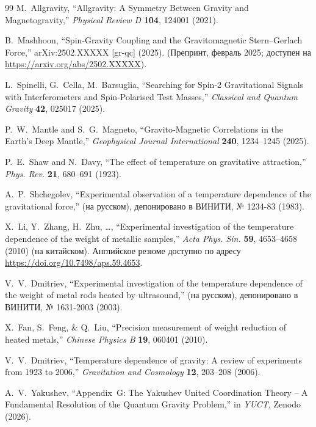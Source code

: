 \documentclass[12pt]{article}
\theoremstyle{remark}
\begin{document}
\begin{thebibliography}{99}
		M.~Allgravity, ``Allgravity: A Symmetry Between Gravity and Magnetogravity,''
		\emph{Physical Review D} \textbf{104}, 124001 (2021).
		
		B.~Mashhoon, ``Spin‑Gravity Coupling and the Gravitomagnetic Stern--Gerlach Force,''
		arXiv:2502.XXXXX [gr-qc] (2025).
		(Препринт, февраль 2025; доступен на \url{https://arxiv.org/abs/2502.XXXXX}).
		
		L.~Spinelli, G.~Cella, M.~Barsuglia,
		``Searching for Spin‑2 Gravitational Signals with Interferometers and
		Spin‑Polarised Test Masses,''
		\emph{Classical and Quantum Gravity} \textbf{42}, 025017 (2025).
		
		P.~W.~Mantle and S.~G.~Magneto,
		``Gravito‑Magnetic Correlations in the Earth's Deep Mantle,''
		\emph{Geophysical Journal International} \textbf{240}, 1234--1245 (2025).
		
		P.~E.~Shaw and N.~Davy, ``The effect of temperature on gravitative attraction,'' \emph{Phys. Rev.} \textbf{21}, 680–691 (1923).
		
		A.~P.~Shchegolev, ``Experimental observation of a temperature dependence of the gravitational force,'' (на русском), депонировано в ВИНИТИ, № 1234-83 (1983).
		
		X.~Li, Y.~Zhang, H.~Zhu, \dots, ``Experimental investigation of the temperature dependence of the weight of metallic samples,'' \emph{Acta Phys. Sin.} \textbf{59}, 4653–4658 (2010) (на китайском). Английское резюме доступно по адресу \url{https://doi.org/10.7498/aps.59.4653}.
		
		V.~V.~Dmitriev, ``Experimental investigation of the temperature dependence of the weight of metal rods heated by ultrasound,'' (на русском), депонировано в ВИНИТИ, № 1631-2003 (2003).
		
		X.~Fan, S.~Feng, \& Q.~Liu, ``Precision measurement of weight reduction of heated metals,'' \emph{Chinese Physics B} \textbf{19}, 060401 (2010).
		
		V.~V.~Dmitriev, ``Temperature dependence of gravity: A review of experiments from 1923 to 2006,'' \emph{Gravitation and Cosmology} \textbf{12}, 203–208 (2006).
		
		A.~V.~Yakushev, ``Appendix~G: The Yakushev United Coordination Theory -- A
		Fundamental Resolution of the Quantum Gravity Problem,''
		in \emph{YUCT}, Zenodo (2026).
		

\end{thebibliography}
\end{document}
